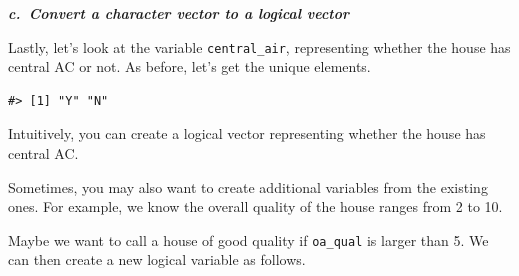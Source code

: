 \documentclass[
]{book}
\newenvironment{Shaded}{\begin{snugshade}}{\end{snugshade}}
\newcommand{\DecValTok}[1]{\textcolor[rgb]{0.00,0.00,0.81}{#1}}
\newcommand{\FunctionTok}[1]{\textcolor[rgb]{0.00,0.00,0.00}{#1}}
\newcommand{\NormalTok}[1]{#1}
\newcommand{\OtherTok}[1]{\textcolor[rgb]{0.56,0.35,0.01}{#1}}
\newcommand{\SpecialCharTok}[1]{\textcolor[rgb]{0.00,0.00,0.00}{#1}}
\newcommand{\StringTok}[1]{\textcolor[rgb]{0.31,0.60,0.02}{#1}}
\begin{document}
\textbf{\emph{c.~Convert a character vector to a logical vector}}

Lastly, let's look at the variable \texttt{central\_air}, representing whether the house has central AC or not. As before, let's get the unique elements.

\begin{Shaded}
\end{Shaded}

\begin{verbatim}
#> [1] "Y" "N"
\end{verbatim}

Intuitively, you can create a logical vector representing whether the house has central AC.

\begin{Shaded}
\end{Shaded}

Sometimes, you may also want to create additional variables from the existing ones. For example, we know the overall quality of the house ranges from 2 to 10.

\begin{Shaded}
\end{Shaded}

Maybe we want to call a house of good quality if \texttt{oa\_qual} is larger than 5. We can then create a new logical variable as follows.

\begin{Shaded}
\end{Shaded}
\end{document}
